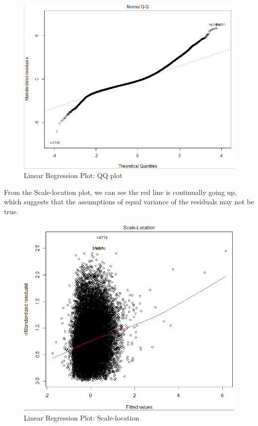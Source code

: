 \documentclass[12pt]{article}
\begin{document}
    \begin{figure}[!]
        \centering
        \includegraphics[width=\linewidth]{linear_qq.png}
        \caption{Linear Regression Plot: QQ plot}
    \end{figure}    
    From the Scale-location plot, we can see the red line is continually going up, which suggests that the assumptions of equal variance of the residuals may not be true.  \\
    \begin{figure}[!]
        \centering
        \includegraphics[width=\linewidth]{linear_sl.png}
        \caption{Linear Regression Plot: Scale-location}
    \end{figure}    
\end{document}
